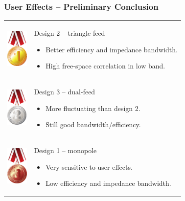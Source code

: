 \begin{frame}
    \frametitle{User Effects -- Preliminary Conclusion}
    \begin{tabular}{m{0.4in}m{4in}}
        \rule{0pt}{0.9in}\includegraphics[height=0.75in]{img/soren/1st.pdf} & 
            Design 2 -- triangle-feed
            \begin{itemize}
                \item Better efficiency and impedance bandwidth.
                \item High free-space correlation in low band. 
            \end{itemize}
            \\
        \rule{0pt}{0.9in}\includegraphics[height=0.75in]{img/soren/2nd.pdf} & 
            Design 3 -- dual-feed
            \begin{itemize}
                \item More fluctuating than design 2.
                \item Still good bandwidth/efficiency.
            \end{itemize}
            \\
        \rule{0pt}{0.9in}\includegraphics[height=0.75in]{img/soren/3rd.pdf} & 
            Design 1 -- monopole
            \begin{itemize}
                \item Very sensitive to user effects.
                \item Low efficiency and impedance bandwidth.
            \end{itemize}
    \end{tabular}
\end{frame}

